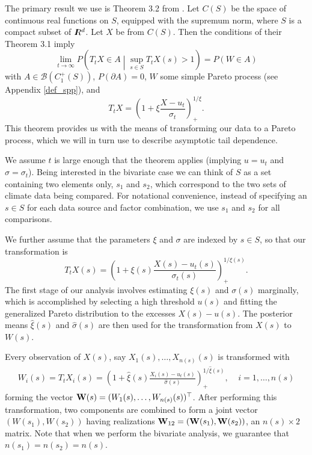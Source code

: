 The primary result we use is Theorem 3.2 from \cite{ferreira2014generalized}. Let $C(S)$ be the space of continuous real functions on $S$, equipped with the supremum norm, where $S$ is a compact subset of $I\hspace{-4.4pt}R^d$. Let $X$ be from $C(S)$. Then the conditions of their Theorem 3.1 imply
\[ \lim_{t\rightarrow\infty} P\left(T_t X \in A \middle| \sup_{s\in S} T_t X(s) > 1\right) = P(W \in A) \]
with $A \in \mathcal{B}(C_1^+(S))$, $P(\partial A)=0$, $W$ some simple Pareto process (see Appendix \ref{def_spp}), and
\[ T_t X = \left(1 + \xi \frac{X - u_t}{\sigma_t}\right)_+^{1/\xi}. \]
This theorem provides us with the means of transforming our data to a Pareto process, which we will in turn use to describe asymptotic tail dependence.

We assume $t$ is large enough that the theorem applies (implying $u=u_t$ and $\sigma=\sigma_t$). Being interested in the bivariate case we can think of $S$ as a set containing two elements only, $s_1$ and $s_2$, which correspond to the two sets of climate data being compared. For notational convenience, instead of specifying an $s\in S$ for each data source and factor combination, we use $s_1$ and $s_2$ for all comparisons.

We further assume that the parameters $\xi$ and $\sigma$ are indexed by $s\in S$, so that our transformation is
\[ T_t X(s) = \left(1 + \xi(s) \frac{X(s) - u_t(s)}{\sigma_t(s)}\right)_+^{1/\xi(s)}. \]
The first stage of our analysis involves estimating $\xi(s)$ and $\sigma(s)$ marginally, which is accomplished by selecting a high threshold $u(s)$ and fitting the generalized Pareto distribution to the excesses $X(s)-u(s)$. The posterior means $\hat{\xi}(s)$ and $\hat{\sigma}(s)$ are then used for the transformation from $X(s)$ to $W(s)$.

Every observation of $X(s)$, say $X_1(s),\ldots,X_{n(s)}(s)$ is transformed with
\begin{align}
W_i(s) = T_t X_i(s) = \left(1 + \hat{\xi}(s) \frac{X_i(s) - u_t(s)}{\hat{\sigma}(s)}\right)_+^{1/\hat{\xi}(s)},~~~~~i=1,\ldots,n(s) \label{transform}
\end{align}
forming the vector $\mathbf{\bm{W}}(s)=(W_1(s),\ldots,W_{n(s)}(s))^\top$. After performing this transformation, two components are combined to form a joint vector $(W(s_1), W(s_2))$ having realizations $\mathbf{\bm{W}}_{12}=(\mathbf{\bm{W}}(s_1), \mathbf{\bm{W}}(s_2))$, an $n(s)\times 2$ matrix. Note that when we perform the bivariate analysis, we guarantee that $n(s_1)=n(s_2)=n(s)$.

